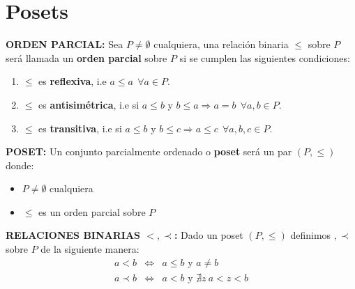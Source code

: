 \section{Posets}
  \PN \textbf{ORDEN PARCIAL:} Sea $P \neq \emptyset$ cualquiera, una relación binaria $\leq$ sobre $ P$ será llamada un
  \textbf{orden parcial} sobre $P$ si se cumplen las siguientes condiciones:
  \begin{enumerate}
    \item $\leq$ es \textbf{reflexiva}, i.e $a \leq a \ \ \forall a \in P$.
    \item $\leq$ es \textbf{antisimétrica}, i.e si $a \leq b$ y $b \leq a \Rightarrow a=b \ \ \forall a, b \in P$.
    \item $\leq$ es \textbf{transitiva}, i.e si $a \leq b$ y $b \leq c \Rightarrow a \leq c \ \ \forall a, b, c \in P$.
  \end{enumerate}

  \PN \textbf{POSET:} Un conjunto parcialmente ordenado o \textbf{poset} será un par $(P,\leq)$ donde:
  \begin{itemize}
    \item $P \neq \emptyset$ cualquiera
    \item $\leq$ es un orden parcial sobre $P$
  \end{itemize}

  \PN \textbf{RELACIONES BINARIAS $<, \prec$:} Dado un poset $(P, \leq)$ definimos $, \prec$ sobre $P$ de la siguiente
  manera:
  \begin{eqnarray*}
    a < b &\Leftrightarrow& a \leq b \text{ y } a \neq b \\
    a \prec b &\Leftrightarrow& a < b \text{ y } \nexists z \ a < z < b
  \end{eqnarray*}

